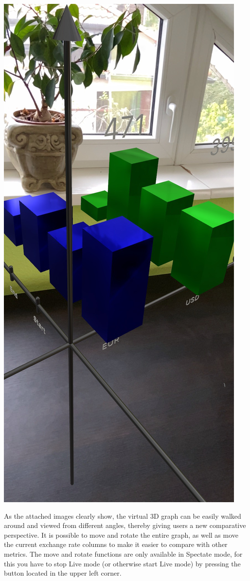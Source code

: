 \documentclass{report}
\begin{document}
\includegraphics[scale=0.2]{top.jpeg}

As the attached images clearly show, the virtual 3D graph can be easily walked around and viewed from different angles, thereby giving users a new comparative perspective. It is possible to move and rotate the entire graph, as well as move the current exchange rate columns to make it easier to compare with other metrics. The move and rotate functions are only available in Spectate mode, for this you have to stop Live mode (or otherwise start Live mode) by pressing the button located in the upper left corner.
\end{document}
